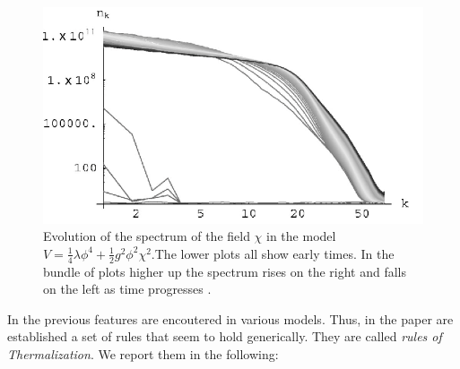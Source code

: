 \documentclass[11pt,a4paper,twoside]{book}
\begin{document}
\begin{figure}
	\centering
	\includegraphics[width=0.6\linewidth, height=0.25\textheight]{Images/Chap6/DevelopmentOfEquilibrium_fig2}
	\caption{Evolution of the spectrum of the field $\chi$ in the model $ V=\frac{1}{4}\lambda \phi^{4} + \frac{1}{2}g^{2}\phi^{2}\chi^{2}. $The lower plots all show early times. In the bundle of plots higher up the spectrum rises on the right and falls on the left as time progresses  \cite{Chap6:DevelopmentEquilibrium}. }
	\label{fig:developmentofequilibriumfig2}
\end{figure}
In \cite{Chap6:DevelopmentEquilibrium} the previous features are encoutered in various models.  Thus, in the paper are established a set of rules that seem to hold generically. They are called \textit{rules of Thermalization}. We report them in the following:
\end{document}
